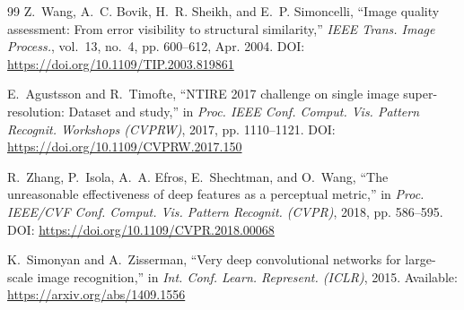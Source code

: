 \documentclass[10pt,onecolumn,journal]{IEEEtran}
\begin{document}
\begin{thebibliography}{99}
Z.~Wang, A.~C. Bovik, H.~R. Sheikh, and E.~P. Simoncelli, ``Image quality assessment: From error visibility to structural similarity,'' \emph{IEEE Trans. Image Process.}, vol.~13, no.~4, pp. 600--612, Apr. 2004. DOI: \url{https://doi.org/10.1109/TIP.2003.819861}

E.~Agustsson and R.~Timofte, ``NTIRE 2017 challenge on single image super-resolution: Dataset and study,'' in \emph{Proc. IEEE Conf. Comput. Vis. Pattern Recognit. Workshops (CVPRW)}, 2017, pp. 1110--1121. DOI: \url{https://doi.org/10.1109/CVPRW.2017.150}

R.~Zhang, P.~Isola, A.~A. Efros, E.~Shechtman, and O.~Wang, ``The unreasonable effectiveness of deep features as a perceptual metric,'' in \emph{Proc. IEEE/CVF Conf. Comput. Vis. Pattern Recognit. (CVPR)}, 2018, pp. 586--595. DOI: \url{https://doi.org/10.1109/CVPR.2018.00068}

K.~Simonyan and A.~Zisserman, ``Very deep convolutional networks for large-scale image recognition,'' in \emph{Int. Conf. Learn. Represent. (ICLR)}, 2015. Available: \url{https://arxiv.org/abs/1409.1556}

\end{thebibliography}
\end{document}

